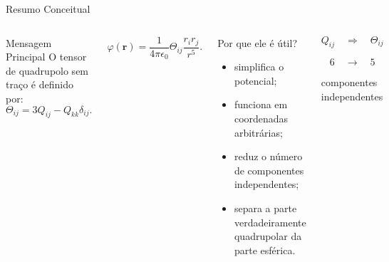 \documentclass[aspectratio=169]{beamer}
\begin{document}
\begin{frame}{Resumo Conceitual}

\begin{columns}[T]


\begin{mybox}{Mensagem Principal}
O tensor de quadrupolo sem traço é definido por:
\[
\Theta_{ij}
=
3Q_{ij}
-
Q_{kk}\delta_{ij}.
\]
\end{mybox}

\vspace{0.2cm}

\begin{eqbox}
\[
\varphi(\mathbf r)
=
\frac{1}{4\pi\epsilon_0}
\Theta_{ij}
\frac{r_i r_j}{r^5}.
\]
\end{eqbox}


\begin{alertblock}{Por que ele é útil?}
\begin{itemize}
\item simplifica o potencial;

\vspace{0.1cm}

\item funciona em coordenadas arbitrárias;

\vspace{0.1cm}

\item reduz o número de componentes independentes;

\vspace{0.1cm}

\item separa a parte verdadeiramente quadrupolar da parte esférica.
\end{itemize}
\end{alertblock}

\vspace{0.3cm}

\begin{center}


\[
Q_{ij}
\quad\Rightarrow\quad
\Theta_{ij}
\]



\Large
\[
6
\quad\longrightarrow\quad
5
\]



componentes independentes

\end{center}

\end{columns}

\end{frame}
\end{document}
